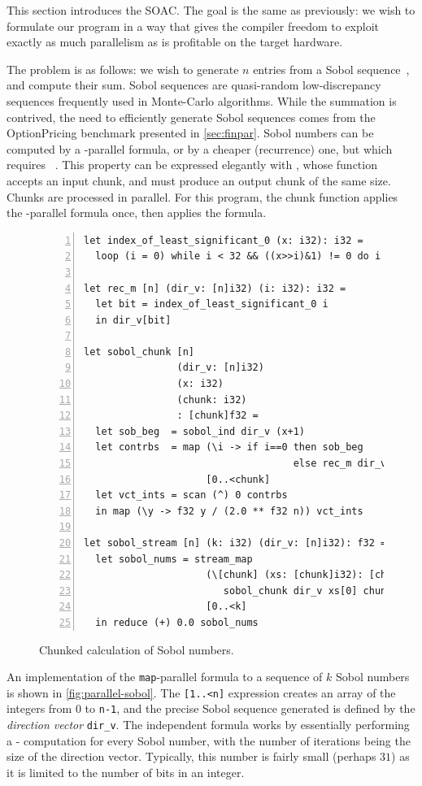 This section introduces the \StreamMap{} SOAC.  The goal is the same
as previously: we wish to formulate our program in a way that gives
the compiler freedom to exploit exactly as much parallelism as is
profitable on the target hardware.

The problem is as follows: we wish to generate $n$ entries from a
Sobol sequence~\cite{Sobol}, and compute their sum.  Sobol sequences
are quasi-random low-discrepancy sequences frequently used in
Monte-Carlo algorithms.  While the summation is contrived, the need to
efficiently generate Sobol sequences comes from the OptionPricing
benchmark presented in \cref{sec:finpar}.  Sobol numbers can be
computed by a -parallel formula, or by a cheaper (recurrence)
one, but which requires ~\cite{FinPar:TACO,LexiFiPricing}.
This property can be expressed elegantly with \StreamMap{}, whose
function accepts an input chunk, and must produce an output chunk of
the same size.  Chunks are processed in parallel.  For this program,
the chunk function applies the -parallel formula once, then
applies the  formula.

\begin{figure}
\begin{lstlisting}[numbers=left,xleftmargin=0pt]
let index_of_least_significant_0 (x: i32): i32 =
  loop (i = 0) while i < 32 && ((x>>i)&1) != 0 do i + 1

let rec_m [n] (dir_v: [n]i32) (i: i32): i32 =
  let bit = index_of_least_significant_0 i
  in dir_v[bit]

let sobol_chunk [n]
                (dir_v: [n]i32)
                (x: i32)
                (chunk: i32)
                : [chunk]f32 =
  let sob_beg  = sobol_ind dir_v (x+1)
  let contrbs  = map (\i -> if i==0 then sob_beg
                                    else rec_m dir_v (i+x))
                     [0..<chunk]
  let vct_ints = scan (^) 0 contrbs
  in map (\y -> f32 y / (2.0 ** f32 n)) vct_ints

let sobol_stream [n] (k: i32) (dir_v: [n]i32): f32 =
  let sobol_nums = stream_map
                     (\[chunk] (xs: [chunk]i32): [chunk]f32 ->
                        sobol_chunk dir_v xs[0] chunk)
                     [0..<k]
  in reduce (+) 0.0 sobol_nums
\end{lstlisting}
\caption{Chunked calculation of Sobol numbers.}
\label{fig:streamed-sobol}
\end{figure}

An implementation of the \texttt{map}-parallel formula to a sequence
of
$k$ Sobol numbers is shown in \cref{fig:parallel-sobol}.  The
\texttt{[1..<n]} expression creates an array of the integers from
$0$ to \texttt{n-1}, and the precise Sobol sequence generated is
defined by the \textit{direction vector} \texttt{dir\_v}.  The
independent formula works by essentially performing a
- computation for every Sobol number, with the
number of iterations being the size of the direction vector.
Typically, this number is fairly small (perhaps
$31$) as it is limited to the number of bits in an integer.

